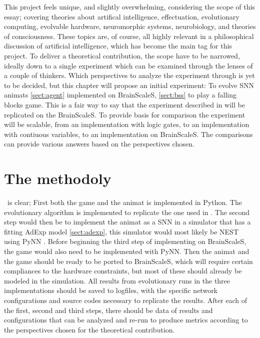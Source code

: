 This project feels unique, and slightly overwhelming, considering the scope of this essay; covering theories about artifical intelligence, effectuation, evolutionary computing, evolvable hardware, neuromorphic systems, neurobiology, and theories of consciousness.
These topics are, of course, all highly relevant in a philosophical discussion of artificial intelligence, which has become the main tag for this project.
To deliver a theoretical contribution, the scope have to be narrowed, ideally down to a single experiment which can be examined through the lenses of a couple of thinkers.
Which perspectives to analyze the experiment through is yet to be decided, but this chapter will propose an initial experiment:
To evolve SNN  animats \vref{sect:agent} implemented on BrainScaleS, \vref{sect:bss} to play a falling blocks game.
This is a fair way to say that the experiment described in \cite{albantakis_evolution_2014} will be replicated on the BrainScaleS.
To provide basis for comparison the experiment will be scalable, from an implementation with logic gates, to an implementation with contiuous variables, to an implementation on BrainScaleS.
The comparisons can provide various answers based on the perspectives chosen.

\section{The methodoly} is clear; First both the game and the animat is implemented in Python.
The evolutionary algorithm is implemented to replicate the one used in \cite{albantakis_evolution_2014}.
The second step would then be to implement the animat as a SNN in a simulator that has a fitting AdExp model \vref{sect:adexp},
this simulator would most likely be NEST \cite{fardet_nest_2020} using PyNN \cite{davison_pynn_2009}.
Before beginning the third step of implementing on BrainScaleS, the game would also need to be implemented with PyNN.
Then the animat and the game should be ready to be ported to BrainScaleS, which will require certain compliances to the hardware constraints,
but most of these should already be modeled in the simulation.
All results from evolutionary runs in the three implementations should be saved to logfiles, with the specific network configurations and source codes necessary to replicate the results.
After each of the first, second and third steps, there should be data of results and configurations that can be analyzed and re-run to produce metrics according to the perspectives chosen for the theoretical contribution.

